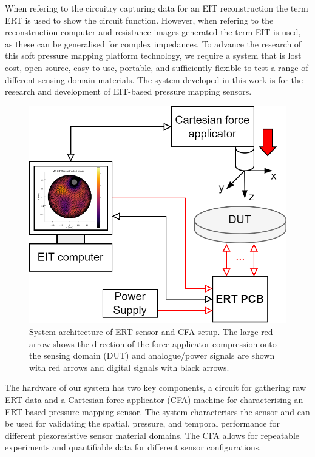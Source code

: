 When refering to the circuitry capturing data for an EIT reconstruction the term ERT is used to show the circuit function. However, when refering to the reconstruction computer and resistance images generated the term EIT is used, as these can be generalised for complex impedances.
To advance the research of this soft pressure mapping platform technology, we require a system that is lost cost, open source, easy to use, portable, and sufficiently flexible to test a range of different sensing domain materials. The system developed in this work is for the research and development of EIT-based pressure mapping sensors.
\begin{figure}[H]
	\centering
	\includegraphics[width=0.5\linewidth]{Figures/ERT_PCB_and_CFA_system_simple.png}
	\caption{System architecture of ERT sensor and CFA setup. The large red arrow shows the direction of the force applicator compression onto the sensing domain (DUT) and analogue/power signals are shown with red arrows and digital signals with black arrows.}
	\label{fig:ERT_PCB_CFA_archit}
\end{figure}
The hardware of our system has two key components, a circuit for gathering raw ERT data and a Cartesian force applicator (CFA) machine for characterising an ERT-based pressure mapping sensor. The system characterises the sensor and can be used for validating the spatial, pressure, and temporal performance for different piezoresistive sensor material domains. The CFA allows for repeatable experiments and quantifiable data for different sensor configurations.



